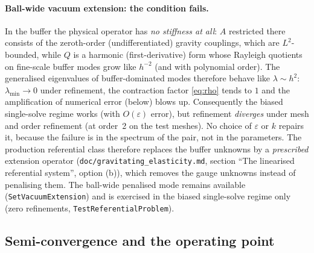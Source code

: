 \documentclass[11pt]{article}
\newcommand{\eps}{\varepsilon}
\begin{document}
\paragraph{Ball-wide vacuum extension: the condition fails.}
In the buffer the physical operator has \emph{no stiffness at all}:
$A$ restricted there consists of the zeroth-order (undifferentiated)
gravity couplings, which are $L^{2}$-bounded, while $Q$ is a harmonic
(first-derivative) form whose Rayleigh quotients on fine-scale buffer
modes grow like $h^{-2}$ (and with polynomial order). The generalised
eigenvalues of buffer-dominated modes therefore behave like
$\lambda \sim h^{2}$: $\lambda_{\min} \to 0$ under refinement, the
contraction factor \eqref{eq:rho} tends to $1$ and the amplification of
numerical error (below) blows up. Consequently the biased single-solve
regime works (with $O(\eps)$ error), but refinement \emph{diverges}
under mesh and order refinement (at order~2 on the test meshes). No
choice of $\eps$ or $k$ repairs it, because the failure is in the
spectrum of the pair, not in the parameters. The production referential
class therefore replaces the buffer unknowns by a \emph{prescribed}
extension operator (\texttt{doc/gravitating\_elasticity.md}, section
``The linearised referential system'', option (b)), which removes the
gauge unknowns instead of penalising them. The ball-wide penalised mode
remains available (\texttt{SetVacuumExtension}) and is exercised in the
biased single-solve regime only (zero refinements, \texttt{TestReferentialProblem}).

\subsection{Semi-convergence and the operating point}
\label{sec:semiconv}
\end{document}
